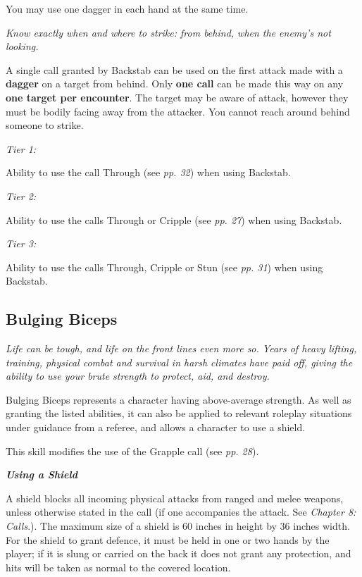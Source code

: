 You may use one dagger in each hand at the same time.

\textit{Know exactly when and where to strike: from behind, when the enemy's not looking.}

A single call granted by Backstab can be used on the first attack made with a \textbf{dagger} on a target from behind. Only \textbf{one call} can be made this way on any \textbf{one target per encounter}. The target may be aware of attack, however they must be bodily facing away from the attacker. You cannot reach around behind someone to strike.

\textit{Tier 1:}

Ability to use the call Through (see \textit{pp. 32}) when using Backstab.

\textit{Tier 2:}

Ability to use the calls Through or Cripple (see \textit{pp. 27}) when using Backstab.

\textit{Tier 3:}

Ability to use the calls Through, Cripple or Stun (see \textit{pp. 31}) when using Backstab.

\subsection{Bulging Biceps}

\textit{Life can be tough, and life on the front lines even more so. Years of heavy lifting, training, physical combat and survival in harsh climates have paid off, giving the ability to use your brute strength to protect, aid, and destroy.}

Bulging Biceps represents a character having above-average strength. As well as granting the listed abilities, it can also be applied to relevant roleplay situations under guidance from a referee, and allows a character to use a shield.

This skill modifies the use of the Grapple call (see \textit{pp. 28}).

\textbf{\textit{Using a Shield}}

A shield blocks all incoming physical attacks from ranged and melee weapons, unless otherwise stated in the call (if one accompanies the attack. See \textit{Chapter 8: Calls}.). The maximum size of a shield is 60 inches in height by 36 inches width. For the shield to grant defence, it must be held in one or two hands by the player; if it is slung or carried on the back it does not grant any protection, and hits will be taken as normal to the covered location.

